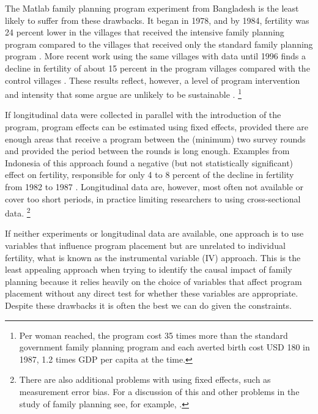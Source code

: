 \documentclass[letterpaper,12pt]{article}
\begin{document}
The Matlab family planning program experiment from Bangladesh is the
least likely to suffer from these drawbacks.
It began in 1978, and by 1984, fertility was 24 percent lower in the 
villages that received the intensive family planning program compared to the villages 
that received only the standard family planning program \citep{Phillips1988}.
More recent work using the same villages with data until 1996 finds a decline in fertility
of about 15 percent in the program villages compared with the control villages 
\citep{Sinha2005,Joshi2007}.
These results reflect, however, a level of program intervention and intensity
that some argue are unlikely to be sustainable \citep{pritchett94a}.%
\footnote{
Per woman reached, the program cost 35 times more than the standard government family 
planning program and each averted birth cost USD 180 in 1987, 1.2 times GDP per capita 
at the time.
}

If longitudinal data were collected in parallel with the introduction of the 
program, program effects can be estimated using fixed effects, provided there
are enough areas that receive a program between the (minimum) 
two survey rounds and provided the period between the rounds is long 
enough.
Examples from Indonesia of this approach found a negative (but not statistically 
significant) effect on fertility, responsible for only 4 to 8 percent of the 
decline in fertility from 1982 to 1987 \citep{pitt93,Gertler1994}.
Longitudinal data are, however, most often not available or cover too short 
periods, in practice limiting researchers to using cross-sectional data.%
\footnote{%
There are also additional problems with using fixed effects, such as measurement error 
bias.
For a discussion of this and other problems in the study of family planning
see, for example, \cite{angeles98}.
}

If neither experiments or longitudinal data are available, one approach is to use 
variables that influence program placement but are unrelated to individual fertility,
what is known as the instrumental variable (IV) approach.
This is the least appealing approach when trying to identify the causal
impact of family planning because it relies heavily on the choice of
variables that affect program placement without any direct test for whether
these variables are appropriate.
Despite these drawbacks it is often the best we can do given the constraints.
\end{document}
